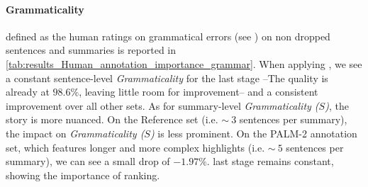 \begin{table}[!ht]
\centering
{}
\caption{We compare performance of \metric{} when using a deplotter (DePlot) vs. using gold tables.}
\label{tab:results_gold_table_vs_deplot}
\end{table}


\paragraph{Grammaticality} defined as the human ratings on grammatical errors (see ) on non dropped sentences and summaries is reported in \cref{tab:results_Human_annotation_importance_grammar}. When applying \metric, we see a constant sentence-level \emph{Grammaticality} for the \pipeline last stage --The quality is already at $98.6\%$, leaving little room for improvement-- and a consistent improvement over all other sets. 
As for summary-level \emph{Grammaticality ($S$)}, the story is more nuanced.
On the Reference set (i.e. $\sim~3$ sentences per summary),
the impact on \emph{Grammaticality ($S$)} is less prominent.
On the PALM-2 annotation set, which features longer and more complex highlights (i.e. $\sim~5$ sentences per summary), we can see a small drop of $-1.97\%$.
\pipeline{} last stage remains constant, showing the importance of ranking.

